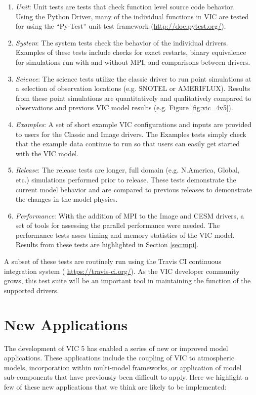 \documentclass[gmd, manuscript]{copernicus}
\begin{document}
    \begin{enumerate}
      \item \textit{Unit}: Unit tests are tests that check function level source code behavior.
      Using the Python Driver, many of the individual functions in VIC are tested for using the ``Py-Test'' unit test framework (\url{http://doc.pytest.org/}).
      \item \textit{System}: The system tests check the behavior of the individual drivers.
      Examples of these tests include checks for exact restarts, binary equivalence for simulations run with and without MPI, and comparisons between drivers.
      \item \textit{Science}: The science tests utilize the classic driver to run point simulations at a selection of observation locations (e.g. SNOTEL or AMERIFLUX).
      Results from these point simulations are quantitatively and qualitatively compared to observations and previous VIC model results (e.g. Figure \ref{fig:vic_4v5}).
      \item \textit{Examples}: A set of short example VIC configurations and inputs are provided to users for the Classic and Image drivers.
      The Examples tests simply check that the example data continue to run so that users can easily get started with the VIC model.
      \item \textit{Release}: The release tests are longer, full domain (e.g. N.America, Global, etc.) simulations performed prior to release.
      These tests demonstrate the current model behavior and are compared to previous releases to demonstrate the changes in the model physics.
      \item \textit{Performance}: With the addition of MPI to the Image and CESM drivers, a set of tools for assessing the parallel performance were needed.
      The performance tests asses timing and memory statistics of the VIC model.
      Results from these tests are highlighted in Section \ref{sec:mpi}.
    \end{enumerate}

    A subset of these tests are routinely run using the Travis CI continuous integration system ( \url{https://travis-ci.org/}).
    As the VIC developer community grows, this test suite will be an important tool in maintaining the function of the supported drivers.

\section{New Applications}
  \label{sec:new_apps}
  The development of VIC 5 has enabled a series of new or improved model applications.
  These applications include the coupling of VIC to atmospheric models, incorporation within multi-model frameworks, or application of model sub-components that have previously been difficult to apply.
  Here we highlight a few of these new applications that we think are likely to be implemented:
\end{document}
